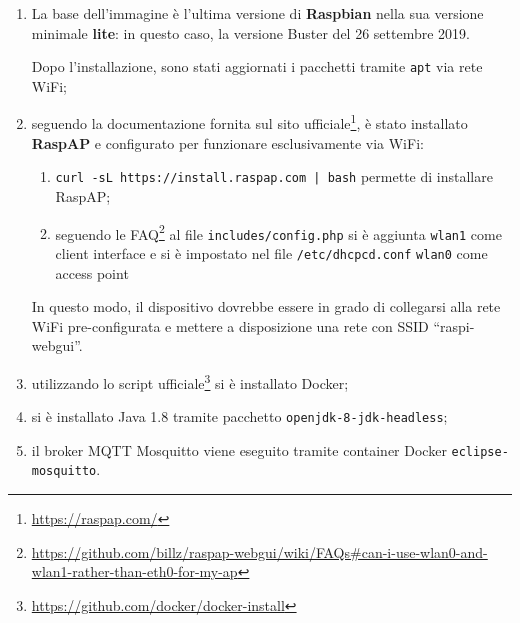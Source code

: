 \begin{enumerate}
  \item
    La base dell'immagine è l'ultima versione di \textbf{Raspbian} nella sua versione minimale \textbf{lite}:
    in questo caso, la versione Buster del 26 settembre 2019.

    Dopo l'installazione, sono stati aggiornati i pacchetti tramite \texttt{apt} via rete WiFi;
  \item
    seguendo la documentazione fornita sul sito ufficiale\footnote{\url{https://raspap.com/}},
    è stato installato \textbf{RaspAP} e configurato per funzionare esclusivamente via WiFi:
    \begin{enumerate}
      \item
        \texttt{curl -sL https://install.raspap.com | bash} permette di installare RaspAP\@;
      \item
        seguendo le FAQ\footnote{\url{https://github.com/billz/raspap-webgui/wiki/FAQs\#can-i-use-wlan0-and-wlan1-rather-than-eth0-for-my-ap}}
        al file \texttt{includes/config.php} si è aggiunta \texttt{wlan1} come client interface e si è impostato nel file \texttt{/etc/dhcpcd.conf}
        \texttt{wlan0} come access point
    \end{enumerate}
    In questo modo, il dispositivo dovrebbe essere in grado di collegarsi alla rete WiFi pre-configurata e mettere a disposizione una rete con SSID ``raspi-webgui''.
  \item
    utilizzando lo script ufficiale\footnote{\url{https://github.com/docker/docker-install}} si è installato Docker;
  \item
    si è installato Java 1.8 tramite pacchetto \texttt{openjdk-8-jdk-headless};
  \item
    il broker MQTT Mosquitto viene eseguito tramite container Docker \texttt{eclipse-mosquitto}.
\end{enumerate}

